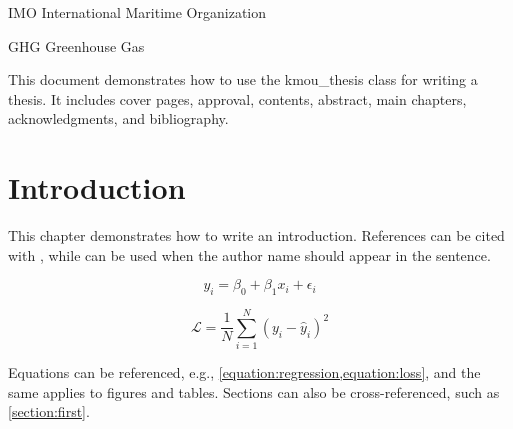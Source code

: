 \documentclass{kmou_thesis}
\begin{document}
\frontmatter
\maketitlepage
\maketitlepage %
\makeapprovalpage %

\makecontents %
\makelistoftables
\makelistoffigures

\begin{abbreviations}
  \item[IMO] International Maritime Organization
  \item[GHG] Greenhouse Gas
\end{abbreviations}

\makeabstract
\begin{abstractbody}
This document demonstrates how to use the kmou\_thesis class for writing a thesis.  
It includes cover pages, approval, contents, abstract, main chapters, acknowledgments, and bibliography.  
\end{abstractbody}

\printkeywords

\mainmatter

\chapter{Introduction}
This chapter demonstrates how to write an introduction.  
References can be cited with \citep{adila_understanding_2021,zhuang_comprehensive_2021-1},  
while \citet{zhuang_comprehensive_2021-1} can be used when the author name should appear in the sentence.  

\begin{equation}
  y_i = \beta_0 + \beta_1 x_i + \epsilon_i
  \label{equation:regression}
\end{equation}

\begin{equation}
  \mathcal{L} = \frac{1}{N}\sum_{i=1}^{N}(y_i - \hat{y}_i)^2
  \label{equation:loss}
\end{equation}

Equations can be referenced, e.g., \cref{equation:regression,equation:loss},  
and the same applies to figures and tables.  
Sections can also be cross-referenced, such as \cref{section:first}.
\end{document}
